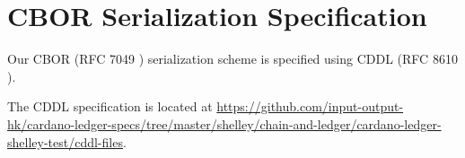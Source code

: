 \section{CBOR Serialization Specification}
\label{sec:cddl}

Our CBOR (RFC 7049 \cite{rfcCBOR})
serialization scheme is specified using
CDDL (RFC 8610 \cite{rfcCDDL}).

The CDDL specification is located at
\url{https://github.com/input-output-hk/cardano-ledger-specs/tree/master/shelley/chain-and-ledger/cardano-ledger-shelley-test/cddl-files}.

% 
